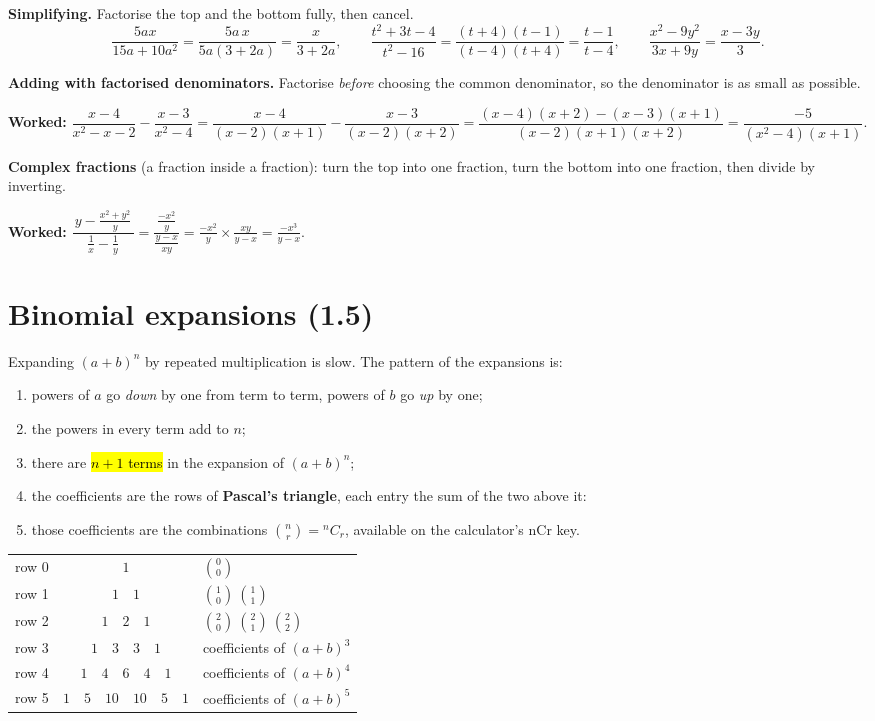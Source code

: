 \documentclass[11pt]{article}
\newcommand{\key}[1]{\hl{#1}}
\newcommand{\wex}[1]{\textbf{\color{lilacdeep}Worked:} #1}
\begin{document}
\textbf{Simplifying.} Factorise the top and the bottom fully, then cancel.
\[\frac{5ax}{15a+10a^{2}}=\frac{5a\,x}{5a(3+2a)}=\frac{x}{3+2a},\qquad
\frac{t^{2}+3t-4}{t^{2}-16}=\frac{(t+4)(t-1)}{(t-4)(t+4)}=\frac{t-1}{t-4},\qquad
\frac{x^{2}-9y^{2}}{3x+9y}=\frac{x-3y}{3}.\]

\textbf{Adding with factorised denominators.} Factorise \emph{before} choosing the common denominator, so the denominator is as small as possible.

\wex{$\dfrac{x-4}{x^{2}-x-2}-\dfrac{x-3}{x^{2}-4}
=\dfrac{x-4}{(x-2)(x+1)}-\dfrac{x-3}{(x-2)(x+2)}
=\dfrac{(x-4)(x+2)-(x-3)(x+1)}{(x-2)(x+1)(x+2)}=\dfrac{-5}{(x^{2}-4)(x+1)}$.}

\textbf{Complex fractions} (a fraction inside a fraction): turn the top into one fraction, turn the bottom into one fraction, then divide by inverting.

\wex{$\dfrac{\,y-\frac{x^{2}+y^{2}}{y}\,}{\ \frac1x-\frac1y\ }
=\dfrac{\frac{-x^{2}}{y}}{\frac{y-x}{xy}}
=\frac{-x^{2}}{y}\times\frac{xy}{y-x}=\frac{-x^{3}}{y-x}$.}

\section{Binomial expansions (1.5)}

Expanding $(a+b)^{n}$ by repeated multiplication is slow. The pattern of the expansions is:

\begin{enumerate}[topsep=2pt,itemsep=0pt,leftmargin=*]
\item powers of $a$ go \emph{down} by one from term to term, powers of $b$ go \emph{up} by one;
\item the powers in every term add to $n$;
\item there are \key{\mbox{$n+1$} terms} in the expansion of $(a+b)^{n}$;
\item the coefficients are the rows of \textbf{Pascal's triangle}, each entry the sum of the two above it:
\item those coefficients are the combinations $\binom nr={}^nC_r$, available on the calculator's \textsf{nCr} key.
\end{enumerate}

\vspace{-0.5em}
\begin{center}
\begin{tabular}{@{}r@{\quad}c@{\qquad}l@{}}
row 0 & $1$ & \small\color{greyish}$\binom00$\\
row 1 & $1\quad1$ & \small\color{greyish}$\binom10\ \binom11$\\
row 2 & $1\quad2\quad1$ & \small\color{greyish}$\binom20\ \binom21\ \binom22$\\
row 3 & $1\quad3\quad3\quad1$ & \small\color{greyish}coefficients of $(a+b)^{3}$\\
row 4 & $1\quad4\quad6\quad4\quad1$ & \small\color{greyish}coefficients of $(a+b)^{4}$\\
row 5 & $1\quad5\quad10\quad10\quad5\quad1$ & \small\color{greyish}coefficients of $(a+b)^{5}$\\
\end{tabular}
\end{center}
\end{document}
